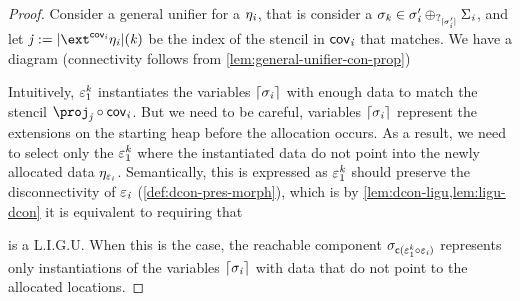 \begin{proof}
    Consider a general unifier for a $\eta_{\mathit{i}}$, that is consider a $\sigma_{\mathit{k}} \in \sigma_{\mathit{i}}' \oplus_{?_{[\sigma_{\mathit{i}}']}} \Sigma_{\mathit{i}}$,
    and let $\vj \eqdef \indF{\ext^{\cov_\vi}\mvarM_\vi}(\vk)$ be the index of the stencil in $\mathsf{cov}_{\mathit{i}}$ that matches.
    We have a diagram (connectivity follows from \cref{lem:general-unifier-con-prop})
    \begin{center}
    \end{center}

    Intuitively, $\varepsilon^{\mathit{k}}_1$ instantiates the variables $\lceil\sigma_{\mathit{i}}\rceil$ with enough data to match the stencil $\proj_\vj \comp \cov_\vi$.
    But we need to be careful, variables $\lceil\sigma_{\mathit{i}}\rceil$ represent the extensions on the starting heap before the allocation occurs.
    As a result, we need to select only the $\varepsilon^{\mathit{k}}_1$ where the instantiated data do not point into the newly allocated data $\eta_{\varepsilon_{\mathit{i}}}$.
    Semantically, this is expressed as $\varepsilon^{\mathit{k}}_1$ should preserve the disconnectivity of $\varepsilon_{\mathit{i}}$ (\cref{def:dcon-pres-morph}),
    which is by \cref{lem:dcon-ligu,lem:ligu-dcon} it is equivalent to requiring that
\begin{center}
\end{center}
    is a L.I.G.U.
    When this is the case, the reachable component $\sigma_{\mathsf{c}(\varepsilon^{\mathit{k}}_1 \circ \varepsilon_{\mathit{i}})}$ represents only instantiations of the variables $\lceil\sigma_{\mathit{i}}\rceil$
    with data that do not point to the allocated locations.


\end{proof}
